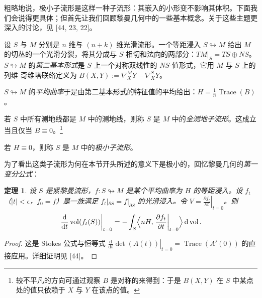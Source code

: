 \documentclass[11pt,a4paper]{article}
\theoremstyle{plain}
\newtheorem{theorem}{定理}[section]
\theoremstyle{definition}
\begin{document}
粗略地说，极小子流形是这样一种子流形：其嵌入的小形变不影响其体积。下面我们会说得更具体；但首先让我们回顾黎曼几何中的一些基本概念。关于这些主题更深入的讨论，见 [44, 23, 22]。

设 $S$ 与 $M$ 分别是 $n$ 维与 $(n+k)$ 维光滑流形。一个等距浸入 $S\looparrowright M$ 给出 $M$ 的切丛的一个光滑分裂，将其分成与 $S$ 相切和法向的两部分：$TM|_S=TS\oplus NS$。$S\looparrowright M$ 的\emph{第二基本形式}是 $S$ 上一个对称双线性的 $NS$-值形式，它用 $M$ 与 $S$ 上的列维-奇维塔联络定义为 $B(X,Y):=\nabla^M_XY-\nabla^S_XY$。

$S\looparrowright M$ 的\emph{平均曲率}于是由第二基本形式的特征值的平均给出：$H=\frac{1}{n}\operatorname{Trace}(B)$。

若 $S$ 中所有测地线都是 $M$ 中的测地线，则称 $S$ 是 $M$ 中的\emph{全测地子流形}。这成立当且仅当 $B\equiv0$。\footnote{较不平凡的方向可通过观察 $B$ 是对称的来得到：于是 $B(X,Y)$ 在 $S$ 中某点处的值只依赖于 $X$ 与 $Y$ 在该点的值。}

若 $H\equiv0$，则称 $S$ 是 $M$ 中的\emph{极小子流形}。

为了看出这类子流形为何在本节开头所述的意义下是极小的，回忆黎曼几何的\emph{第一变分公式}：

\begin{theorem}
设 $S$ 是紧黎曼流形，$f:S\looparrowright M$ 是某个平均曲率为 $H$ 的等距浸入。设 $f_t$（$|t|<\epsilon$，$f_0=f$）是一族满足 $f_t|_{\partial S}=f|_{\partial S}$ 的光滑浸入。令 $V=\left.\frac{\partial f_t}{\partial t}\right|_{t=0}$。则
\[
\left.\frac{\mathrm{d}}{\mathrm{d}t}\operatorname{vol}(f_t(S))\right|_{t=0}
=-\int_S\Bigl\langle nH,\left.\frac{\partial f_t}{\partial t}\right|_{t=0}\Bigr\rangle\,\mathrm{d}\operatorname{vol}.
\]
\end{theorem}

\begin{proof}
这是 Stokes 公式与恒等式 $\left.\frac{\mathrm{d}}{\mathrm{d}t}\det(A(t))\right|_{t=0}=\operatorname{Trace}(A'(0))$ 的直接应用。详细证明见 [44]。
\end{proof}
\end{document}

